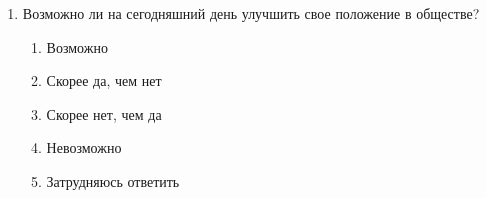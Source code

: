 \begin{enumerate}
    \item Возможно ли на сегодняшний день улучшить свое положение в обществе?
    \begin{enumerate}
        \item[\dline] Возможно
        \item[\dline] Скорее да, чем нет
        \item[\dline] Скорее нет, чем да
        \item[\dline] Невозможно
        \item[\dline] Затрудняюсь ответить
    \end{enumerate}
\end{enumerate}
